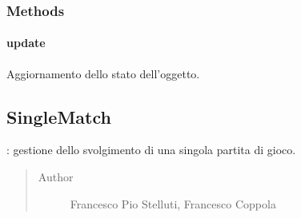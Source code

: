 \documentclass[letterpaper,10pt,italian,openany,oneside]{sphinxmanual}
\begin{document}
\subsubsection{Methods}
\label{\detokenize{source/it/unicam/cs/pa/mastermind/gamecore/Observer:methods}}

\paragraph{update}
\label{\detokenize{source/it/unicam/cs/pa/mastermind/gamecore/Observer:update}}

\begin{fulllineitems}
\label{\detokenize{source/it/unicam/cs/pa/mastermind/gamecore/Observer:it.unicam.cs.pa.mastermind.gamecore.Observer.update(Observable)}}
Aggiornamento dello stato dell’oggetto.

\end{fulllineitems}



\subsection{SingleMatch}
\label{\detokenize{source/it/unicam/cs/pa/mastermind/gamecore/SingleMatch:singlematch}}\label{\detokenize{source/it/unicam/cs/pa/mastermind/gamecore/SingleMatch::doc}}

\begin{fulllineitems}
\label{\detokenize{source/it/unicam/cs/pa/mastermind/gamecore/SingleMatch:it.unicam.cs.pa.mastermind.gamecore.SingleMatch}}
: gestione dello svolgimento di una singola partita di gioco.
\begin{quote}\begin{description}
\item[{Author}] \leavevmode
Francesco Pio Stelluti, Francesco Coppola

\end{description}\end{quote}

\end{fulllineitems}
\end{document}
